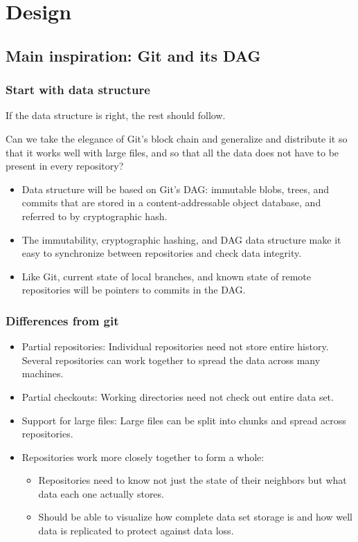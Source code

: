 \documentclass[a4paper]{article}
\begin{document}
\section{Design}\label{design}


\subsection{Main inspiration: Git and its DAG}\label{main-inspiration-git}

\subsubsection{Start with data structure}

If the data structure is right, the rest should follow.

Can we take the elegance of Git's block chain and generalize and
distribute it so that it works well with large files, and so that all
the data does not have to be present in every repository?

\begin{itemize}
\item
  Data structure will be based on Git's DAG: immutable blobs, trees, and commits
  that are stored in a content-addressable object database, and referred to by
  cryptographic hash.
\item
  The immutability, cryptographic hashing, and DAG data structure make it easy
  to synchronize between repositories and check data integrity.
\item
  Like Git, current state of local branches, and known state of remote
  repositories will be pointers to commits in the DAG.
\end{itemize}

\subsubsection{Differences from git}

\begin{itemize}
\item
  Partial repositories: Individual repositories need not store entire
  history. Several repositories can work together to spread the data
  across many machines.
\item
  Partial checkouts: Working directories need not check out entire data
  set.
\item
  Support for large files: Large files can be split into chunks and
  spread across repositories.
\item
  Repositories work more closely together to form a whole:

  \begin{itemize}
  \item
    Repositories need to know not just the state of their neighbors but what
    data each one actually stores.
  \item
    Should be able to visualize how complete data set storage is and how
    well data is replicated to protect against data loss.
  \end{itemize}
\end{itemize}
\end{document}

